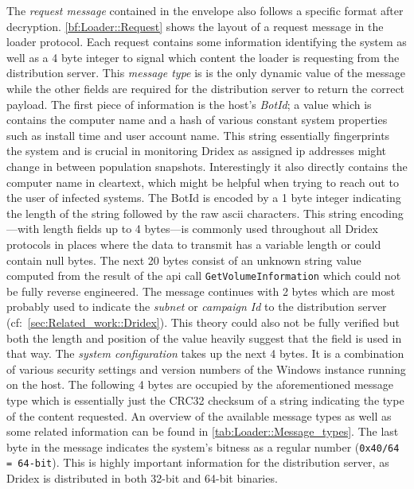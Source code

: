 The \emph{request message} contained in the envelope also follows a specific format after decryption.
\autoref{bf:Loader::Request} shows the layout of a request message in the loader protocol.
Each request contains some information identifying the system as well as a 4 byte integer to signal which content the loader is requesting from the distribution server.
This \emph{message type} is is the only dynamic value of the message while the other fields are required for the distribution server to return the correct payload.
The first piece of information is the host's \emph{BotId}; a value which is contains the computer name and a hash of various constant system properties such as install time and user account name.
This string essentially fingerprints the system and is crucial in monitoring Dridex as assigned \gls{ip} addresses might change in between population snapshots.
Interestingly it also directly contains the computer name in cleartext, which might be helpful when trying to reach out to the user of infected systems.
The BotId is encoded by a 1 byte integer indicating the length of the string followed by the raw \gls{ascii} characters.
This string encoding---with length fields up to 4 bytes---is commonly used throughout all Dridex protocols in places where the data to transmit has a variable length or could contain null bytes.
The next 20 bytes consist of an unknown string value computed from the result of the \gls{api} call \lstinline|GetVolumeInformation| which could not be fully reverse engineered.
The message continues with 2 bytes which are most probably used to indicate the \emph{subnet} or \emph{campaign Id} to the distribution server (cf:~\autoref{sec:Related_work::Dridex}).
This theory could also not be fully verified but both the length and position of the value heavily suggest that the field is used in that way.
The \emph{system configuration} takes up the next 4 bytes.
It is a combination of various security settings and version numbers of the Windows instance running on the host.
The following 4 bytes are occupied by the aforementioned message type which is essentially just the CRC32 checksum of a string indicating the type of the content requested.
An overview of the available message types as well as some related information can be found in \autoref{tab:Loader::Message_types}.
The last byte in the message indicates the system's bitness as a regular number (\lstinline|0x40/64 = 64-bit|).
This is highly important information for the distribution server, as Dridex is distributed in both 32-bit and 64-bit binaries.

